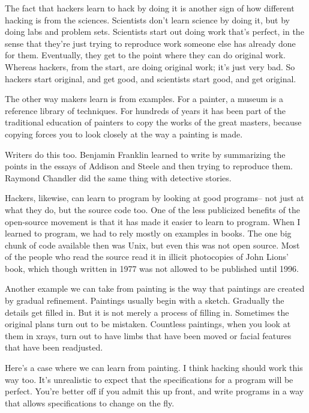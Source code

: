 \documentclass[12pt]{book}
\begin{document}
The fact that hackers learn to hack by doing it is another sign of how
different hacking is from the sciences. Scientists don't learn science
by doing it, but by doing labs and problem sets. Scientists start out
doing work that's perfect, in the sense that they're just trying to
reproduce work someone else has already done for them. Eventually, they
get to the point where they can do original work. Whereas hackers, from
the start, are doing original work; it's just very bad. So hackers start
original, and get good, and scientists start good, and get original.

The other way makers learn is from examples. For a painter, a museum is
a reference library of techniques. For hundreds of years it has been
part of the traditional education of painters to copy the works of the
great masters, because copying forces you to look closely at the way a
painting is made.

Writers do this too. Benjamin Franklin learned to write by summarizing
the points in the essays of Addison and Steele and then trying to
reproduce them. Raymond Chandler did the same thing with detective
stories.

Hackers, likewise, can learn to program by looking at good programs--
not just at what they do, but the source code too. One of the less
publicized benefits of the open-source movement is that it has made it
easier to learn to program. When I learned to program, we had to rely
mostly on examples in books. The one big chunk of code available then
was Unix, but even this was not open source. Most of the people who read
the source read it in illicit photocopies of John Lions' book, which
though written in 1977 was not allowed to be published until 1996.

Another example we can take from painting is the way that paintings are
created by gradual refinement. Paintings usually begin with a sketch.
Gradually the details get filled in. But it is not merely a process of
filling in. Sometimes the original plans turn out to be mistaken.
Countless paintings, when you look at them in xrays, turn out to have
limbs that have been moved or facial features that have been readjusted.

Here's a case where we can learn from painting. I think hacking should
work this way too. It's unrealistic to expect that the specifications
for a program will be perfect. You're better off if you admit this up
front, and write programs in a way that allows specifications to change
on the fly.
\end{document}
